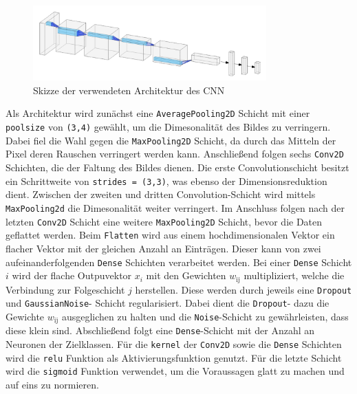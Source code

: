 \begin{figure}[h]
		\centering
		\includegraphics[width=0.8\textwidth]{pictures/architecture.pdf}
		\caption{Skizze der verwendeten Architektur des CNN \cite{nnsvg}}
		\label{fig:}
\end{figure}
Als Architektur wird zunächst eine \texttt{AveragePooling2D} Schicht mit einer
\texttt{poolsize} von \texttt{(3,4)} gewählt, um die Dimesonalität des Bildes zu verringern.
Dabei fiel die Wahl gegen die \texttt{MaxPooling2D} Schicht, da durch das 
Mitteln der Pixel deren Rauschen verringert werden kann.
Anschließend folgen sechs \texttt{Conv2D} Schichten, die der Faltung des Bildes
dienen. 
Die erste Convolutionschicht besitzt ein Schrittweite von \texttt{strides =
(3,3)}, was ebenso der Dimensionsreduktion dient.
Zwischen der zweiten und dritten Convolution-Schicht wird mittels
\texttt{MaxPooling2d} die Dimesonalität weiter verringert. 
Im Anschluss folgen nach der letzten \texttt{Conv2D} Schicht eine weitere
\texttt{MaxPooling2D} Schicht, bevor die Daten geflattet werden.
Beim \texttt{Flatten} wird aus einem hochdimensionalen Vektor ein flacher Vektor
mit der gleichen Anzahl an Einträgen.
Dieser kann von zwei aufeinanderfolgenden \texttt{Dense} Schichten verarbeitet
werden.
Bei einer \texttt{Dense} Schicht $i$ wird der flache Outpuvektor $x_i$ mit den
Gewichten $w_\text{ij}$ multipliziert, welche die Verbindung zur Folgeschicht
$j$ herstellen.
Diese werden durch jeweils eine \texttt{Dropout} und \texttt{GaussianNoise}- 
Schicht regularisiert. 
Dabei dient die \texttt{Dropout}- dazu die Gewichte $w_\text{ij}$ ausgeglichen
zu halten  
und die \texttt{Noise}-Schicht zu gewährleisten, dass diese klein sind.
Abschließend folgt eine \texttt{Dense}-Schicht mit der Anzahl an Neuronen der
Zielklassen.
Für die \texttt{kernel} der \texttt{Conv2D} sowie die \texttt{Dense}
Schichten wird die \texttt{relu} Funktion als Aktivierungsfunktion
genutzt.
Für die letzte Schicht wird die \texttt{sigmoid} Funktion verwendet, um die
Voraussagen glatt zu machen und auf eins zu normieren.
